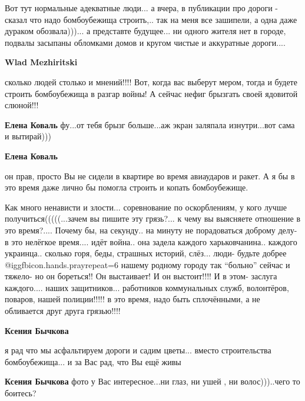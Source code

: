 \begin{itemize} %

Вот тут нормальные адекватные люди... а вчера, в публикации про дороги - сказал
что надо бомбоубежища строить,.. так на меня все зашипели, а одна даже дураком
обозвала)))... а представте будущее... ни одного жителя нет в городе, подвалы
засыпаны обломками домов и кругом чистые и аккуратные дороги....

\begin{itemize} %
\textbf{Wlad Mezhiritski} 

сколько людей столько и мнений!!!! Вот, когда вас выберут мером, тогда и будете
строить бомбоубежища в разгар войны! А сейчас нефиг брызгать своей ядовитой
слюной!!!

\begin{itemize} %
\textbf{Елена Коваль} фу...от тебя брызг больше...аж экран заляпала изнутри...вот сама и вытирай)))

\textbf{Елена Коваль} 

он прав, просто Вы не сидели в квартире во время авиаударов и ракет. А я бы в
это время даже лично бы помогла строить и копать бомбоубежище.

\end{itemize} %


Как много ненависти и злости... соревнование по оскорблениям, у кого лучше
получиться(((((...зачем вы пишите эту грязь?... к чему вы выясняете отношение в
это время?.... Почему бы, на секунду.. на минуту не порадоваться доброму делу- в
это нелёгкое время.... идёт война.. она задела каждого харьковчанина.. каждого
украинца.. сколько горя, беды, страшных историй, слёз... люди- будьте
добрее @igg{fbicon.hands.pray}{repeat=6} нашему родному городу так \enquote{больно} сейчас и тяжело- но он
бореться!! Он выстаивает! И он выстоит!!!! И в этом- заслуга каждого.... наших
защитников... работников коммунальных служб, волонтёров, поваров, нашей
полиции!!!!! в это время, надо быть сплочёнными, а не обливается друг друга
грязью!!!!

\begin{itemize} %
\textbf{Ксения Бычкова} 

я рад что мы асфальтируем дороги и садим цветы... вместо строительства
бомбоубежища... и за Вас рад, что Вы ещё живы

\textbf{Ксения Бычкова} фото у Вас интересное...ни глаз, ни ушей , ни волос)))..чего то боитесь?


\end{itemize}
\end{itemize}
\end{itemize}
